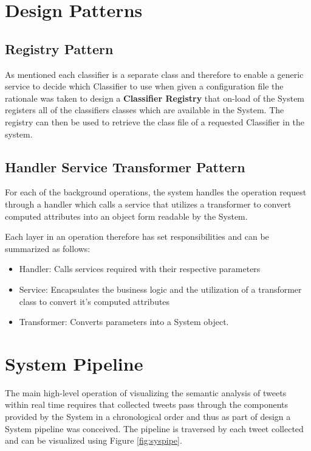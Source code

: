 \documentclass[11pt]{report}
\begin{document}
\clearpage

\section{Design Patterns}

\subsection{Registry Pattern}
As mentioned each classifier is a separate class and therefore to enable a generic service to decide which Classifier to use when given a configuration file the rationale was taken to design a  \textbf{Classifier Registry} that on-load of the System registers all of the classifiers classes which are available in the System. The registry can then be used to retrieve the class file of a requested Classifier in the system.

\subsection{Handler Service Transformer Pattern}
For each of the background operations, the system handles the operation request through a handler which calls a service that utilizes a transformer to convert computed attributes into an object form readable by the System.

Each layer in an operation therefore has set responsibilities and can be summarized as follows:

\begin{itemize}
\item Handler: Calls services required with their respective parameters
\item Service:  Encapsulates the business logic and the utilization of a transformer class to convert it's computed attributes
\item Transformer: Converts parameters into a System object.
\end{itemize}

\clearpage
\section{System Pipeline}
The main high-level operation of visualizing the semantic analysis of tweets within real time requires that collected tweets pass through the components provided by the System in a chronological order and thus as part of design a System pipeline was conceived. The pipeline is traversed by each tweet collected and can be visualized using Figure \ref{fig:syspipe}.
\end{document}
